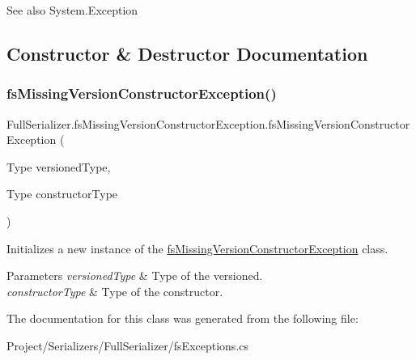 \begin{DoxySeeAlso}{See also}
System.\+Exception


\end{DoxySeeAlso}


\subsection{Constructor \& Destructor Documentation}
\mbox{\label{class_full_serializer_1_1fs_missing_version_constructor_exception_a4bf3e78b5009a68188abfb9bdc8b4f0f}} 
\subsubsection{\texorpdfstring{fs\+Missing\+Version\+Constructor\+Exception()}{fsMissingVersionConstructorException()}}
{\footnotesize\ttfamily Full\+Serializer.\+fs\+Missing\+Version\+Constructor\+Exception.\+fs\+Missing\+Version\+Constructor\+Exception (\begin{DoxyParamCaption}\item[{Type}]{versioned\+Type,  }\item[{Type}]{constructor\+Type }\end{DoxyParamCaption})\hspace{0.3cm}{\ttfamily [inline]}}



Initializes a new instance of the \hyperlink{class_full_serializer_1_1fs_missing_version_constructor_exception}{fs\+Missing\+Version\+Constructor\+Exception} class. 


\begin{DoxyParams}{Parameters}
{\em versioned\+Type} & Type of the versioned.\\
\hline
{\em constructor\+Type} & Type of the constructor.\\
\hline
\end{DoxyParams}


The documentation for this class was generated from the following file\+:\begin{DoxyCompactItemize}
\item 
Project/\+Serializers/\+Full\+Serializer/fs\+Exceptions.\+cs\end{DoxyCompactItemize}
